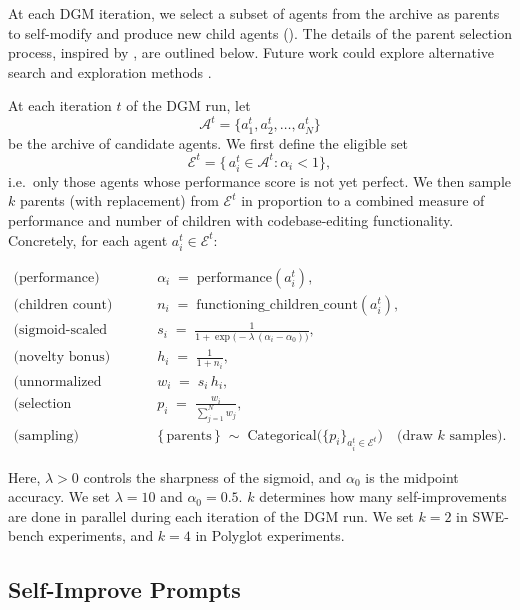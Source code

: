 \documentclass{article}
\begin{document}
At each DGM iteration, we select a subset of agents from the archive as parents to self-modify and produce new child agents (). The details of the parent selection process, inspired by \citet{ecoffet2019go}, are outlined below. Future work could explore alternative search and exploration methods \citep{coulom2006efficient, silver2016mastering, herr2025llm}.

At each iteration \(t\) of the DGM run, let
\[
\mathcal{A}^t = \{a_1^t, a_2^t, \dots, a_N^t\}
\]
be the archive of candidate agents.  We first define the eligible set
\[
\mathcal{E}^t = \bigl\{\,a_i^t \in \mathcal{A}^t : \alpha_i < 1 \bigr\},
\]
i.e.\ only those agents whose performance score is not yet perfect. We then sample \(k\) parents (with replacement) from \(\mathcal{E}^t\) in proportion to a combined measure of performance and number of children with codebase-editing functionality. Concretely, for each agent \(a_i^t \in \mathcal{E}^t\):

\begin{align}
\text{(performance)}\quad & \alpha_i \;=\; \mathrm{performance}(a_i^t), 
\\
\text{(children count)}\quad & n_i \;=\; \mathrm{functioning\_children\_count}(a_i^t),
\\[6pt]
\text{(sigmoid‐scaled performance)}\quad 
& s_i \;=\; \frac{1}{1 + \exp\!\bigl(-\lambda\,(\alpha_i - \alpha_0)\bigr)},
\\[4pt]
\text{(novelty bonus)}\quad 
& h_i \;=\; \frac{1}{1 + n_i},
\\[4pt]
\text{(unnormalized weight)}\quad 
& w_i \;=\; s_i\,h_i,
\\[4pt]
\text{(selection probability)}\quad 
& p_i \;=\; \frac{w_i}{\sum_{j=1}^{N} w_j},
\\[8pt]
\text{(sampling)}\quad 
& \{\,\text{parents}\,\} \;\sim\; \mathrm{Categorical}\bigl(\{p_i\}_{a_i^t \in \mathcal{E}^t}\bigr)\quad\text{(draw \(k\) samples).}
\end{align}

Here, \(\lambda>0\) controls the sharpness of the sigmoid, and \(\alpha_0\) is the midpoint accuracy. We set \(\lambda=10\) and \(\alpha_0=0.5\). \(k\) determines how many self-improvements are done in parallel during each iteration of the DGM run. We set \(k=2\) in SWE-bench experiments, and \(k=4\) in Polyglot experiments.

\subsection{Self-Improve Prompts}
\label{app:selfimprove-prompts}
\end{document}

